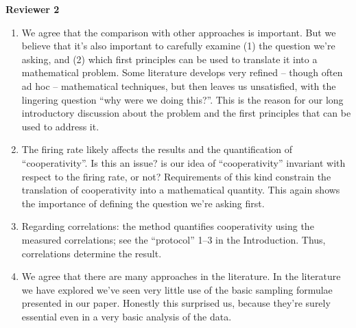 \documentclass{article}
\begin{document}
\textbf{Reviewer 2}
\begin{enumerate}
\item We agree that the comparison with other approaches is important. But
  we believe that it's also important to carefully examine (1) the question
  we're asking, and (2) which first principles can be used to translate it
  into a mathematical problem. Some literature develops very refined --
  though often ad hoc -- mathematical techniques, but then leaves us
  unsatisfied, with the lingering question \enquote{why were we doing
    this?}. This is the reason for our long introductory discussion about
  the problem and the first principles that can be used to address it.
\item The firing rate likely affects the results and the quantification of
  \enquote{cooperativity}. Is this an issue? is our idea of
  \enquote{cooperativity} invariant with respect to the firing rate, or
  not? Requirements of this kind constrain the translation of cooperativity
  into a mathematical quantity. This again shows the importance of defining
  the question we're asking first.
\item Regarding correlations: the method quantifies cooperativity using the
  measured correlations; see the \enquote{protocol} 1--3 in the
  Introduction. Thus, correlations determine the result.
\item We agree that there are many approaches in the literature. In the
  literature we have explored we've seen very little use of the basic
  sampling formulae presented in our paper. Honestly this surprised us,
  because they're surely essential even in a very basic analysis of the data.
\end{enumerate}

\bigskip
\end{document}
